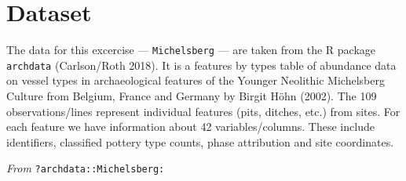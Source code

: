 \documentclass[a3, ruledsections, 8pt]{sciposter}
\begin{document}
\section{Dataset}

The data for this excercise --- \verb|Michelsberg| --- are taken from the R package \verb|archdata| (Carlson/Roth 2018). It is a features by types table of abundance data on vessel types in archaeological features of the Younger Neolithic Michelsberg Culture from Belgium, France and Germany by Birgit Höhn (2002). The 109 observations/lines represent individual features (pits, ditches, etc.) from sites. For each feature we have information about 42 variables/columns. These include identifiers, classified pottery type counts, phase attribution and site coordinates.

\bigskip

\textit{From} \verb|?archdata::Michelsberg:|
\end{document}
